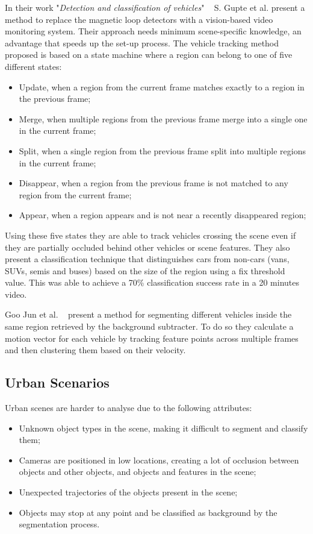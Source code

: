 In their work "\textit{Detection and classification of vehicles}" ~\cite{gupte_detection_2002} S. Gupte et al. present a method to replace the magnetic loop detectors with a vision-based video monitoring system. Their approach needs minimum scene-specific knowledge, an advantage that speeds up the set-up process. The vehicle tracking method proposed is based on a state machine where a region can belong to one of five different states:

\begin{itemize}
	\item Update, when a region from the current frame matches exactly to a region in the previous frame;
	\item Merge, when multiple regions from the previous frame merge into a single one in the current frame;
	\item Split, when a single region from the previous frame split into multiple regions in the current frame;
	\item Disappear, when a region from the previous frame is not matched to any region from the current frame;
	\item Appear, when a region appears and is not near a recently disappeared region;
\end{itemize}

Using these five states they are able to track vehicles crossing the scene even if they are partially occluded behind other vehicles or scene features. They also present a classification technique that distinguishes cars from non-cars (vans, SUVs, semis and buses) based on the size of the region using a fix threshold value. This was able to achieve a 70\% classification success rate in a 20 minutes video.

Goo Jun et al. ~\cite{jun_tracking_2008} present a method for segmenting different vehicles inside the same region retrieved by the background subtracter. To do so they calculate a motion vector for each vehicle by tracking feature points across multiple frames and then clustering them based on their velocity.

\subsection{Urban Scenarios}

Urban scenes are harder to analyse due to the following attributes:

\begin{itemize}
	\item Unknown object types in the scene, making it difficult to segment and classify them;
	\item Cameras are positioned in low locations, creating a lot of occlusion between objects and other objects, and objects and features in the scene;
	\item Unexpected trajectories of the objects present in the scene;
	\item Objects may stop at any point and be classified as background by the segmentation process.
\end{itemize}

